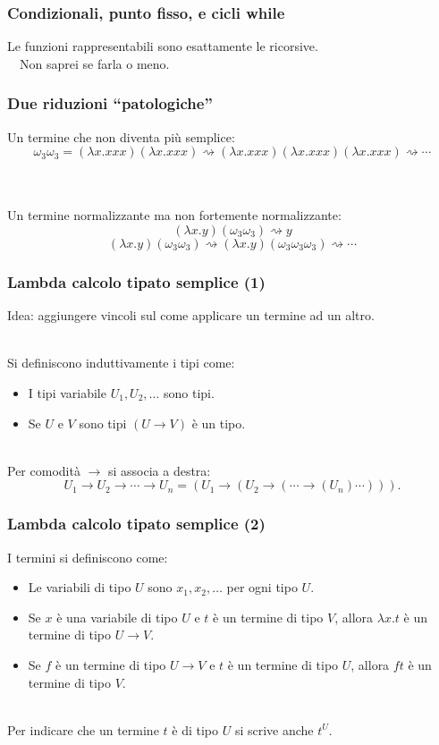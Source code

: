 \documentclass{beamer}
\renewcommand{\l}{\lambda}
\newcommand{\conv}{\rightsquigarrow}
\newcommand{\ar}{\rightarrow}
\begin{document}
\begin{frame}
    \frametitle{Condizionali, punto fisso, e cicli while}
    Le funzioni rappresentabili sono esattamente le ricorsive.
    \\~\
    Non saprei se farla o meno.
\end{frame}

\begin{frame}
    \frametitle{Due riduzioni ``patologiche''}
    Un termine che non diventa pi\`u semplice:
    \[
        \omega_3\omega_3 = (\l x. xxx)(\l x. xxx) \conv (\l x. xxx)(\l x.
        xxx)(\l x. xxx) \conv \cdots
    \]
    \\~\
    
    Un termine normalizzante ma non fortemente normalizzante:
    \[
        (\l x. y)(\omega_3\omega_3) \conv y
    \]
    \[
        (\l x. y)(\omega_3\omega_3) \conv (\l x. y)(\omega_3\omega_3\omega_3)
        \conv \cdots
    \]
\end{frame}

\begin{frame}
    \frametitle{Lambda calcolo tipato semplice (1)}
    Idea: aggiungere vincoli sul come applicare un termine ad un altro.
    \\~\
    
    Si definiscono induttivamente i tipi come:
    \begin{itemize}
        \item I tipi variabile $U_1, U_2, \dots$ sono tipi.
        \item Se $U$ e $V$ sono tipi $(U\ar V)$ \`e un tipo.
    \\~\
    \end{itemize}

    Per comodit\`a $\ar$ si associa a destra:
    \[
        U_1\ar U_2\ar \cdots \ar U_n = (U_1 \ar ( U_2 \ar ( \cdots \ar (U_n)
        \cdots ))).
    \]
\end{frame}


\begin{frame}
    \frametitle{Lambda calcolo tipato semplice (2)}
    
    I termini si definiscono come:
    \begin{itemize}
        \item Le variabili di tipo $U$ sono $x_1, x_2, \dots$ per ogni tipo $U$.
        \item Se $x$ \`e una variabile di tipo $U$ e $t$ \`e un termine di tipo
            $V$, allora $\l x. t$ \`e un termine di tipo $U\ar V$.
        \item Se $f$ \`e un termine di tipo $U\ar V$ e $t$ \`e un termine di
            tipo $U$, allora $ft$ \`e un termine di tipo $V$.
    \\~\
    \end{itemize}

    Per indicare che un termine $t$ \`e di tipo $U$ si scrive anche $t^U$.
\end{frame}
\end{document}
